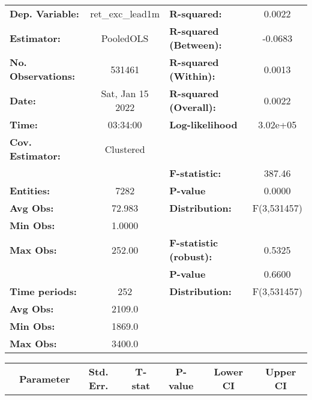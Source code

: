 \begin{center}
\begin{tabular}{lclc}
\toprule
\textbf{Dep. Variable:}    &  ret\_exc\_lead1m  & \textbf{  R-squared:         }   &      0.0022      \\
\textbf{Estimator:}        &     PooledOLS      & \textbf{  R-squared (Between):}  &     -0.0683      \\
\textbf{No. Observations:} &       531461       & \textbf{  R-squared (Within):}   &      0.0013      \\
\textbf{Date:}             &  Sat, Jan 15 2022  & \textbf{  R-squared (Overall):}  &      0.0022      \\
\textbf{Time:}             &      03:34:00      & \textbf{  Log-likelihood     }   &     3.02e+05     \\
\textbf{Cov. Estimator:}   &     Clustered      & \textbf{                     }   &                  \\
\textbf{}                  &                    & \textbf{  F-statistic:       }   &      387.46      \\
\textbf{Entities:}         &        7282        & \textbf{  P-value            }   &      0.0000      \\
\textbf{Avg Obs:}          &       72.983       & \textbf{  Distribution:      }   &   F(3,531457)    \\
\textbf{Min Obs:}          &       1.0000       & \textbf{                     }   &                  \\
\textbf{Max Obs:}          &       252.00       & \textbf{  F-statistic (robust):} &      0.5325      \\
\textbf{}                  &                    & \textbf{  P-value            }   &      0.6600      \\
\textbf{Time periods:}     &        252         & \textbf{  Distribution:      }   &   F(3,531457)    \\
\textbf{Avg Obs:}          &       2109.0       & \textbf{                     }   &                  \\
\textbf{Min Obs:}          &       1869.0       & \textbf{                     }   &                  \\
\textbf{Max Obs:}          &       3400.0       & \textbf{                     }   &                  \\
\bottomrule
\end{tabular}
\begin{tabular}{lcccccc}
                & \textbf{Parameter} & \textbf{Std. Err.} & \textbf{T-stat} & \textbf{P-value} & \textbf{Lower CI} & \textbf{Upper CI}  \\

\end{tabular}
\end{center}
